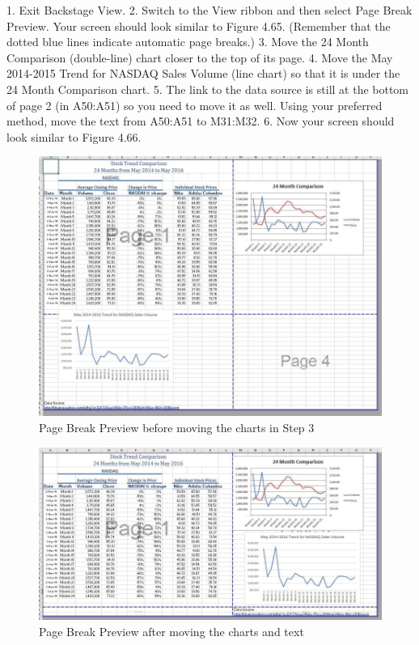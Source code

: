 1. Exit Backstage View.
2. Switch to the View ribbon and then select Page Break Preview. Your screen should look similar
to Figure 4.65. (Remember that the dotted blue lines indicate automatic page breaks.)
3. Move the 24 Month Comparison (double-line) chart closer to the top of its page.
4. Move the May 2014-2015 Trend for NASDAQ Sales Volume (line chart) so that it is under the
24 Month Comparison chart.
5. The link to the data source is still at the bottom of page 2 (in A50:A51) so you need to move it as
well. Using your preferred method, move the text from A50:A51 to M31:M32.
6. Now your screen should look similar to Figure 4.66.


\begin{figure}[H]
	\centering
	\includegraphics[width=\maxwidth{.95\linewidth}]{gfx/ch04_fig50}
	\caption{Page Break Preview before moving the charts in Step 3}
	\label{04:fig50}
\end{figure}

\begin{figure}[H]
	\centering
	\includegraphics[width=\maxwidth{.95\linewidth}]{gfx/ch04_fig51}
	\caption{Page Break Preview after moving the charts and text}
	\label{04:fig51}
\end{figure}




